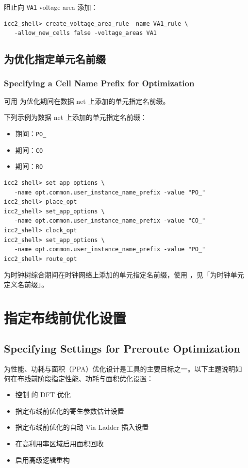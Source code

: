 阻止向 \texttt{VA1} voltage area 添加：
\begin{lstlisting}
icc2_shell> create_voltage_area_rule -name VA1_rule \
   -allow_new_cells false -voltage_areas VA1
\end{lstlisting}

\subsection{为优化指定单元名前缀}
\subsubsection*{Specifying a Cell Name Prefix for Optimization}

可用  为优化期间在数据 net 上添加的单元指定名前缀。

下列示例为数据 net 上添加的单元指定名前缀：
\begin{itemize}
  \item {} 期间：\texttt{PO\_}
  \item {} 期间：\texttt{CO\_}
  \item {} 期间：\texttt{RO\_}
\end{itemize}
\begin{lstlisting}
icc2_shell> set_app_options \
   -name opt.common.user_instance_name_prefix -value "PO_"
icc2_shell> place_opt
icc2_shell> set_app_options \
   -name opt.common.user_instance_name_prefix -value "CO_"
icc2_shell> clock_opt
icc2_shell> set_app_options \
   -name opt.common.user_instance_name_prefix -value "PO_"
icc2_shell> route_opt
\end{lstlisting}

为时钟树综合期间在时钟网络上添加的单元指定名前缀，使用 ，见「为时钟单元定义名前缀」。

\section{指定布线前优化设置}
\subsection*{Specifying Settings for Preroute Optimization}

为性能、功耗与面积（PPA）优化设计是工具的主要目标之一。以下主题说明如何在布线前阶段指定性能、功耗与面积优化设置：
\begin{itemize}
  \item 控制 \cmd{place\_opt} 的 DFT 优化
  \item 指定布线前优化的寄生参数估计设置
  \item 指定布线前优化的自动 Via Ladder 插入设置
  \item 在高利用率区域启用面积回收
  \item 启用高级逻辑重构
\end{itemize}


